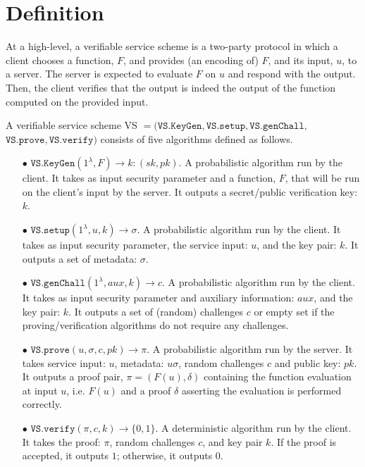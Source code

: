 
\section{Definition}\label{Definition}

At a high-level, a verifiable service scheme is a two-party protocol in which a client chooses a function, $F$, and provides (an encoding of) $F$, and its input, $u$, to a server.  The server is expected to evaluate $F$ on $u$ and respond with the output. Then, the client  verifies that the output is indeed the output of the function computed on the provided input. 


\begin{definition}\label{service-def}
A verifiable service scheme VS $=(\mathtt{VS.KeyGen}, \mathtt{VS.setup},\mathtt{VS.genChall},$ $\mathtt{VS.prove},\mathtt{VS.verify})$ consists of five algorithms defined as follows.

\begin{itemize}

\item[$\bullet$] $\mathtt{VS.KeyGen}(1^{\lambda},F)\rightarrow k:(sk,pk)$.  A probabilistic algorithm run by the client. It takes as input security parameter and a function, $F$, that will be run on the client's input by the server. It outputs a secret/public verification key: $k$. 

\item[$\bullet$] $\mathtt{VS.setup}(1^{\lambda}, u,k)\rightarrow \sigma$. A probabilistic algorithm run by the client. It takes as input security parameter,  the service input: $u$, and the key pair: $k$. It outputs  a set of metadata: $\sigma$.


\item[$\bullet$] $\mathtt{VS.genChall}(1^{\lambda}, aux,k)\rightarrow c$. A probabilistic algorithm run by the client. It takes as input security parameter and auxiliary information: $aux$, and the key pair: $k$. It outputs a set of (random) challenges $c$ or empty set if the proving/verification  algorithms do not require any challenges. %


\item[$\bullet$] $\mathtt{VS.prove}(u,\sigma,c,pk)\rightarrow \pi$. A probabilistic algorithm run by the server. It  takes service input: $u$, metadata: $u\sigma$,  random challenges $c$ and public key: $pk$. It outputs a proof pair, $\pi=(F(u),\delta)$ containing the function evaluation at  input $u$, i.e. $F(u)$ and a proof $\delta$ asserting the evaluation is performed correctly. %

\item[$\bullet$] $\mathtt{VS.verify}(\pi,c,k)\rightarrow \{0,1\}$. A deterministic algorithm run by the client. It takes the proof: $\pi$,  random challenges $c$, and key pair $k$. If the proof is accepted, it outputs $1$; otherwise, it outputs $0$. 
\end{itemize}
\end{definition}



